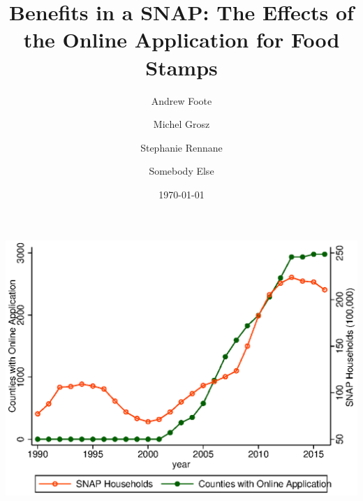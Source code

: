 \documentclass[11pt,letterpaper]{article}
\title{Benefits in a SNAP: The Effects of the Online Application for Food Stamps}
\author[1]{Andrew Foote}
\author[2]{Michel Grosz}
\author[3]{Stephanie Rennane}
\author[4]{Somebody Else}
\affil[1]{Census Bureau}
\affil[2]{Abt Associates}
\affil[3]{RAND Corporation}
\date{\today\\  }
\begin{document}
\maketitle

\includegraphics{tabfig/rolloutgraph}

\end{document}
